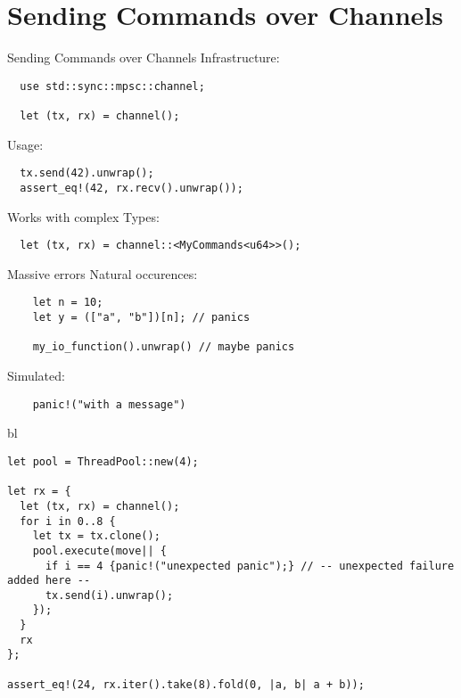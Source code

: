 \documentclass[aspectratio=1610,t]{beamer}
\begin{document}
{
\section{Sending Commands over Channels}
}

\begin{frame}[fragile]{Sending Commands over Channels}
  Infrastructure:
  \begin{verbatim}
  use std::sync::mpsc::channel;

  let (tx, rx) = channel();
  \end{verbatim}

\pause
  Usage:
  \begin{verbatim}
  tx.send(42).unwrap();
  assert_eq!(42, rx.recv().unwrap());
  \end{verbatim}

\pause
  Works with complex Types:
  \begin{verbatim}
  let (tx, rx) = channel::<MyCommands<u64>>();
  \end{verbatim}
\end{frame}



\begin{frame}[fragile]{Massive errors}
  Natural occurences:
  \begin{verbatim}
    let n = 10;
    let y = (["a", "b"])[n]; // panics

    my_io_function().unwrap() // maybe panics
  \end{verbatim}

\pause
  Simulated:
  \begin{verbatim}
    panic!("with a message")
  \end{verbatim}
\end{frame}


\begin{frame}[fragile]{bl}
  \begin{verbatim}
let pool = ThreadPool::new(4);

let rx = {
  let (tx, rx) = channel();
  for i in 0..8 {
    let tx = tx.clone();
    pool.execute(move|| {
      if i == 4 {panic!("unexpected panic");} // -- unexpected failure added here --
      tx.send(i).unwrap();
    });
  }
  rx
};

assert_eq!(24, rx.iter().take(8).fold(0, |a, b| a + b));
  \end{verbatim}
\end{frame}
\end{document}
